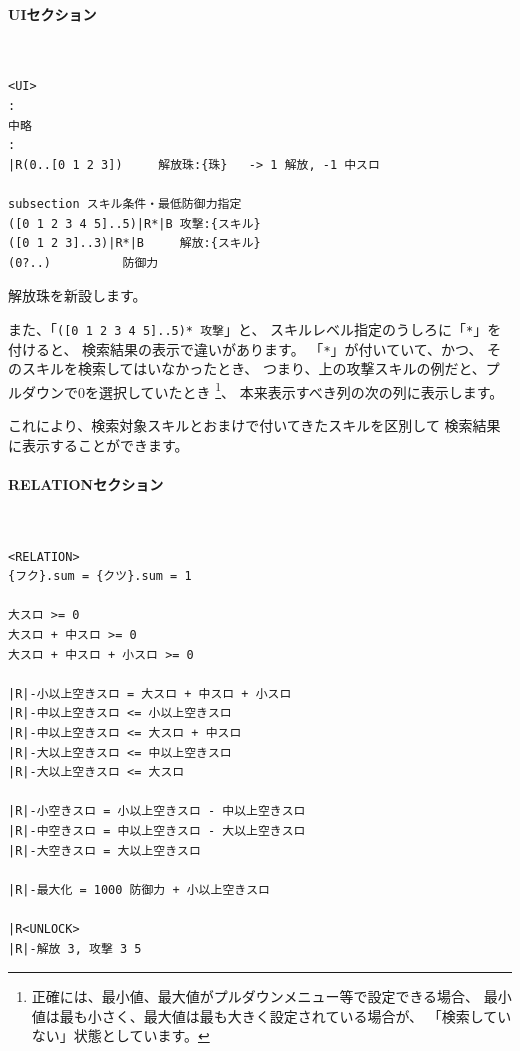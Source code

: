 \documentclass[dvipdfmx]{jsarticle}
\begin{document}
\paragraph{UIセクション}~\medskip
{\footnotesize\begin{mdframed}\begin{Verbatim}[commandchars=|<>]
<UI>
:
中略
:
|R(0..[0 1 2 3])     解放珠:{珠}   -> 1 解放, -1 中スロ

subsection スキル条件・最低防御力指定
([0 1 2 3 4 5]..5)|R*|B 攻撃:{スキル}
([0 1 2 3]..3)|R*|B     解放:{スキル}
(0?..) 		    防御力
\end{Verbatim}
\end{mdframed}}
\medskip

解放珠を新設します。

また、「\texttt{([0 1 2 3 4 5]..5)* 攻撃}」と、
スキルレベル指定のうしろに「\texttt{*}」を付けると、
検索結果の表示で違いがあります。
%
「\texttt{*}」が付いていて、かつ、
そのスキルを検索してはいなかったとき、
つまり、上の攻撃スキルの例だと、プルダウンで0を選択していたとき%
\footnote{
正確には、最小値、最大値がプルダウンメニュー等で設定できる場合、
最小値は最も小さく、最大値は最も大きく設定されている場合が、
「検索していない」状態としています。
}、
本来表示すべき列の次の列に表示します。

これにより、検索対象スキルとおまけで付いてきたスキルを区別して
検索結果に表示することができます。

\paragraph{RELATIONセクション}~\medskip
{\footnotesize\begin{mdframed}\begin{Verbatim}[commandchars=|<>]
<RELATION>
{フク}.sum = {クツ}.sum = 1

大スロ >= 0
大スロ + 中スロ >= 0
大スロ + 中スロ + 小スロ >= 0

|R|-小以上空きスロ = 大スロ + 中スロ + 小スロ
|R|-中以上空きスロ <= 小以上空きスロ
|R|-中以上空きスロ <= 大スロ + 中スロ
|R|-大以上空きスロ <= 中以上空きスロ
|R|-大以上空きスロ <= 大スロ

|R|-小空きスロ = 小以上空きスロ - 中以上空きスロ
|R|-中空きスロ = 中以上空きスロ - 大以上空きスロ
|R|-大空きスロ = 大以上空きスロ

|R|-最大化 = 1000 防御力 + 小以上空きスロ

|R<UNLOCK>
|R|-解放 3, 攻撃 3 5
\end{Verbatim}
\end{mdframed}}
\medskip
\end{document}
